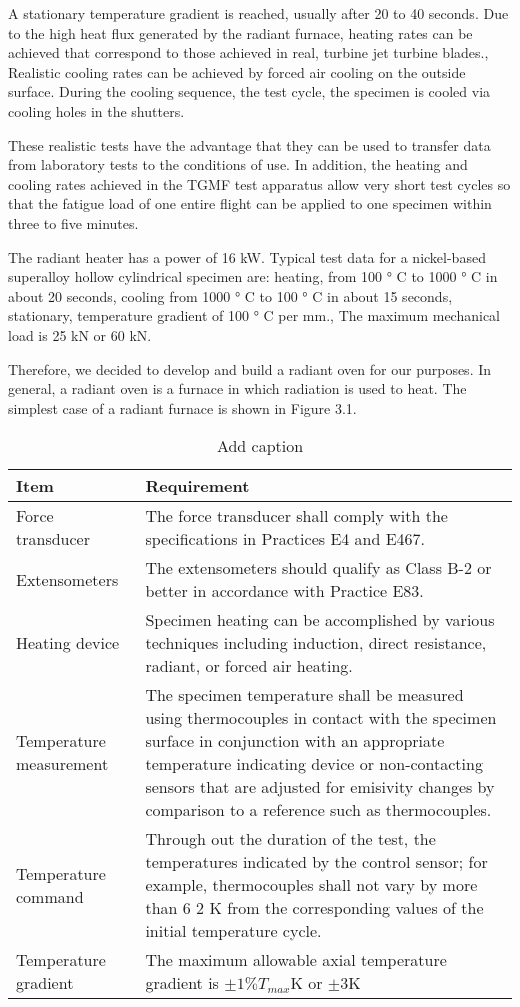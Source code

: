 A stationary temperature gradient is reached, usually after 20 to 40 seconds. Due to the high heat flux generated by the radiant furnace, heating rates can be achieved that correspond to those achieved in real, turbine jet turbine blades., Realistic cooling rates can be achieved by forced air cooling on the outside surface. During the cooling sequence, the test cycle, the specimen is cooled via cooling holes in the shutters.

These realistic tests have the advantage that they can be used to transfer data from laboratory tests to the conditions of use. In addition, the heating and cooling rates achieved in the TGMF test apparatus allow very short test cycles so that the fatigue load of one entire flight can be applied to one specimen within three to five minutes.

The radiant heater has a power of 16 kW. Typical test data for a nickel-based superalloy hollow cylindrical specimen are: heating, from 100 ° C to 1000 ° C in about 20 seconds, cooling from 1000 ° C to 100 ° C in about 15 seconds, stationary, temperature gradient of 100 ° C per mm., The maximum mechanical load is 25 kN or 60 kN.

Therefore, we decided to develop and build a radiant oven for our purposes. In general, a radiant oven is a furnace in which radiation is used to heat. The simplest case of a radiant furnace is shown in Figure 3.1.

\begin{table}[htbp]
  \centering
  \caption{Add caption}
    \begin{tabular}{p{4cm}p{10cm}}
    \toprule
    Item  & Requirement \\
    \midrule
    Force transducer & The force transducer shall comply with the specifications in Practices E4 and E467. \\
    Extensometers & The extensometers should qualify as Class B-2 or better in accordance with Practice E83. \\
    Heating device & Specimen heating can be accomplished by various techniques including induction, direct resistance, radiant, or forced air heating. \\
    Temperature measurement & The specimen temperature shall be measured using thermocouples in contact with the specimen surface in conjunction with an appropriate temperature indicating device or non-contacting sensors that are adjusted for emisivity changes by comparison to a reference such as thermocouples. \\
    Temperature command & Through out the duration of the test, the temperatures indicated by the control sensor; for example, thermocouples shall not vary by more than 6 2 K from the corresponding values of the initial temperature cycle. \\
    Temperature gradient & The maximum allowable axial temperature gradient is $\pm1\% T_{max}$K or $\pm3$K  \\
    \bottomrule
    \end{tabular}%
  \label{tab:addlabel}%
\end{table}%


